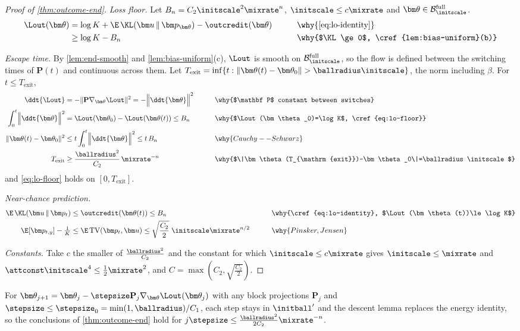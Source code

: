 \begin{proof}[Proof of \cref{thm:outcome-end}]
\emph{Loss floor.} Let $B_n=C_2\initscale^2\mixrate^n$, $\initscale\le c\mixrate$ and $\bm\theta\in\mathcal B^{\mathrm{full}}_{\initscale}$.
\begin{alignat}{2}
 \Lout(\bm\theta)&=\log K+\E\,\KL(\bm u\,\|\,\bm p_{\bm\theta})-\outcredit(\bm\theta) &\qquad& \why{\cref{eq:lo-identity}}\nonumber\\
 &\ge\log K-B_n && \why{$\KL\ge0$, \cref{lem:bias-uniform}(b)}\label{eq:lo-floor}
\end{alignat}

\emph{Escape time.} By \cref{lem:end-smooth} and \cref{lem:bias-uniform}(c), $\Lout$ is smooth on $\mathcal B^{\mathrm{full}}_{\initscale}$, so the flow is defined between the
switching times of $\mathbf P(t)$ and continuous across them. Let $T_{\mathrm{exit}}=\inf\{t:\|\bm\theta(t)-\bm\theta_0\|>\ballradius\initscale\}$, the norm
including $\beta$. For $t\le T_{\mathrm{exit}}$,
\begin{alignat*}{2}
 \ddt{\Lout}&=-\|\mathbf P\nabla_{\bm\theta}\Lout\|^2=-\Bigl\|\ddt{\bm\theta}\Bigr\|^2 &\qquad& \why{$\mathbf P$ constant between switches}\\
 \int_0^t\Bigl\|\ddt{\bm\theta}\Bigr\|^2&=\Lout(\bm\theta_0)-\Lout(\bm\theta(t))\le B_n && \why{$\Lout(\bm\theta_0)=\log K$, \cref{eq:lo-floor}}\\
 \|\bm\theta(t)-\bm\theta_0\|^2&\le t\int_0^t\Bigl\|\ddt{\bm\theta}\Bigr\|^2\le t\,B_n && \why{Cauchy--Schwarz}\\
 T_{\mathrm{exit}}&\ge\frac{\ballradius^2}{C_2}\,\mixrate^{-n} && \why{$\|\bm\theta(T_{\mathrm{exit}})-\bm\theta_0\|=\ballradius\initscale$}
\end{alignat*}
and \cref{eq:lo-floor} holds on $[0,T_{\mathrm{exit}}]$.

\emph{Near-chance prediction.}
\begin{alignat*}{2}
 \E\,\KL(\bm u\,\|\,\bm p_t)&\le\outcredit(\bm\theta(t))\le B_n &\qquad& \why{\cref{eq:lo-identity}, $\Lout(\bm\theta(t))\le\log K$}\\
 \E[\bm p_{t,y}]-\tfrac{1}{K}&\le\E\,\mathrm{TV}(\bm p_t,\bm u)\le\sqrt{\frac{C_2}{2}}\;\initscale\mixrate^{n/2} && \why{Pinsker, Jensen}
\end{alignat*}

\emph{Constants.} Take $c$ the smaller of $\frac{\ballradius^2}{C_2}$ and the constant for which $\initscale\le c\mixrate$ gives $\initscale\le\mixrate$ and
$\attconst\initscale^4\le\frac{1}{2}\mixrate^2$, and $C=\max(C_2,\sqrt{\frac{C_2}{2}})$.
\end{proof}
\begin{remark}
\label{rem:flow}
For $\bm\theta_{j+1}=\bm\theta_j-\stepsize\mathbf P_j\nabla_{\bm\theta}\Lout(\bm\theta_j)$ with any block projections $\mathbf P_j$ and $\stepsize\le\stepsize_0=\min(1,\ballradius)/C_1$, each step stays in
$\initball'$ and the descent lemma replaces the energy identity, so the conclusions of \cref{thm:outcome-end} hold for $j\stepsize\le\frac{\ballradius^2}{2C_2}\mixrate^{-n}$.
\end{remark}

